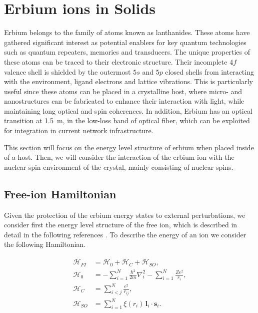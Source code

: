 \setchapterpreamble[u]{\margintoc}


\chapter{Erbium ions in Solids}

Erbium belongs to the family of atoms known as lanthanides. These atoms have gathered significant interest as potential enablers for key quantum technologies such as quantum repeaters, memories and transducers. The unique properties of these atoms can be traced to their electronic structure. Their incomplete $4f$ valence shell is shielded by the outermost $5s$ and $5p$ closed shells from interacting with the environment, ligand electrons and lattice vibrations. This is particularly useful since these atoms can be placed in a crystalline host, where micro- and nanostructures can be fabricated to enhance their interaction with light, while maintaining long optical and spin coherences. In addition, Erbium has an optical transition at 1.5~\textmu m, in the low-loss band of optical fiber, which can be exploited for integration in current network infrastructure. 

This section will focus on the energy level structure of erbium when placed inside of a \Ca host. Then, we will consider the interaction of the erbium ion with the nuclear spin environment of the crystal, mainly consisting of \W nuclear spins. 

\section{Free-ion Hamiltonian}

Given the protection of the erbium energy states to external perturbations, we consider first the energy level structure of the free \Er ion, which is described in detail in the following references . To describe the energy of an ion we consider the following Hamiltonian.

\begin{align}
\begin{split}
\mathcal{H}_{FI} &= \mathcal{H}_0 + \mathcal{H}_C + \mathcal{H}_{SO}, \\
\mathcal{H}_0 &= - \sum_{i=1}^N \frac{\hbar^2}{2m} \nabla_i^2 
- \sum_{i=1}^N \frac{Ze^2}{r_i}, \\
\mathcal{H}_C &= \sum_{i<j}^N \frac{e^2}{r_{ij}}, \\
\mathcal{H}_{SO} &= \sum_{i=1}^N \xi(r_i)\,\mathbf{l}_i \cdot \mathbf{s}_i.
\end{split}
\end{align}

